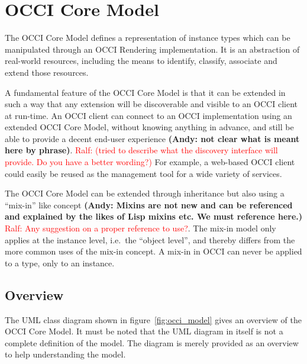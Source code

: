 \documentclass[10pt,a4paper]{article}
\newcommand{\ralf}[1]{\textcolor{red}{Ralf: #1}}
\begin{document}
\section{OCCI Core Model}
The OCCI Core Model defines a representation of instance types which can be
manipulated through an OCCI Rendering implementation. 
It is an abstraction of real-world 
resources, including the means to identify, classify, associate 
and extend those resources. 

A fundamental feature of the OCCI Core Model is that it can be extended in such a
way that any extension will be discoverable and visible to an OCCI client at
run-time. An OCCI client can connect to an OCCI implementation using an
extended OCCI Core Model, without knowing anything in advance, and still be
able to provide a decent end-user experience \textbf{(Andy: not clear what is meant here by phrase)}. 
\ralf{(tried to describe what the discovery interface will provide. Do you have a better wording?)}
For example, a web-based OCCI
client could easily be reused as the management tool for a wide variety of
services.

The OCCI Core Model can be extended through inheritance but also
using a ``mix-in'' like concept \textbf{(Andy: Mixins are not new and can be referenced and explained
by the likes of Lisp mixins etc. We must reference here.)}
\ralf{Any suggestion on a proper reference to use?}.
The mix-in model only applies at the instance
level, i.e.~the ``object level'', and thereby differs from the more common uses
of the mix-in concept. A mix-in in OCCI can never be applied to a type, only to
an instance.

\subsection{Overview}

The UML class diagram shown in figure~\ref{fig:occi_model} gives an overview of
the OCCI Core Model. It must be noted that the UML diagram in itself is not a
complete definition of the model. The diagram is merely provided as an overview
to help understanding the model. 
\end{document}
